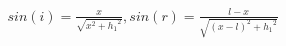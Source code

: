 \documentclass[preview]{standalone}
\begin{document}
\begin{align*}
sin(i) = \frac{x}{\sqrt{x^2 + {h_1}^2}}, sin(r) = \frac{l-x}{\sqrt{(x-l)^2 + {h_1}^2}}
\end{align*}
\end{document}
